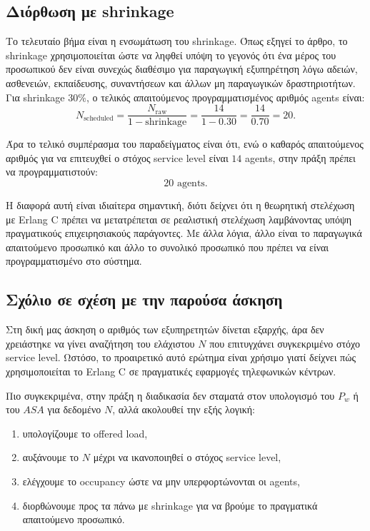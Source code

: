 \documentclass{article}
\begin{document}
\subsection{Διόρθωση με shrinkage}

Το τελευταίο βήμα είναι η ενσωμάτωση του shrinkage. Όπως εξηγεί το άρθρο, το shrinkage χρησιμοποιείται ώστε να ληφθεί υπόψη το γεγονός ότι ένα μέρος του προσωπικού δεν είναι συνεχώς διαθέσιμο για παραγωγική εξυπηρέτηση λόγω αδειών, ασθενειών, εκπαίδευσης, συναντήσεων και άλλων μη παραγωγικών δραστηριοτήτων. Για shrinkage $30\%$, ο τελικός απαιτούμενος προγραμματισμένος αριθμός agents είναι:
\[
N_{\text{scheduled}}
=
\frac{N_{\text{raw}}}{1-\text{shrinkage}}
=
\frac{14}{1-0.30}
=
\frac{14}{0.70}
=
20.
\]

Άρα το τελικό συμπέρασμα του παραδείγματος είναι ότι, ενώ ο καθαρός απαιτούμενος αριθμός για να επιτευχθεί ο στόχος service level είναι $14$ agents, στην πράξη πρέπει να προγραμματιστούν:
\[
\boxed{20 \text{ agents}}.
\]

Η διαφορά αυτή είναι ιδιαίτερα σημαντική, διότι δείχνει ότι η θεωρητική στελέχωση με Erlang C πρέπει να μετατρέπεται σε ρεαλιστική στελέχωση λαμβάνοντας υπόψη πραγματικούς επιχειρησιακούς παράγοντες. Με άλλα λόγια, άλλο είναι το παραγωγικά απαιτούμενο προσωπικό και άλλο το συνολικό προσωπικό που πρέπει να είναι προγραμματισμένο στο σύστημα.

\subsection{Σχόλιο σε σχέση με την παρούσα άσκηση}

Στη δική μας άσκηση ο αριθμός των εξυπηρετητών δίνεται εξαρχής, άρα δεν χρειάστηκε να γίνει αναζήτηση του ελάχιστου $N$ που επιτυγχάνει συγκεκριμένο στόχο service level. Ωστόσο, το προαιρετικό αυτό ερώτημα είναι χρήσιμο γιατί δείχνει πώς χρησιμοποιείται το Erlang C σε πραγματικές εφαρμογές τηλεφωνικών κέντρων.

Πιο συγκεκριμένα, στην πράξη η διαδικασία δεν σταματά στον υπολογισμό του $P_w$ ή του $ASA$ για δεδομένο $N$, αλλά ακολουθεί την εξής λογική:
\begin{enumerate}
    \item υπολογίζουμε το offered load,
    \item αυξάνουμε το $N$ μέχρι να ικανοποιηθεί ο στόχος service level,
    \item ελέγχουμε το occupancy ώστε να μην υπερφορτώνονται οι agents,
    \item διορθώνουμε προς τα πάνω με shrinkage για να βρούμε το πραγματικά απαιτούμενο προσωπικό.
\end{enumerate}
\end{document}
